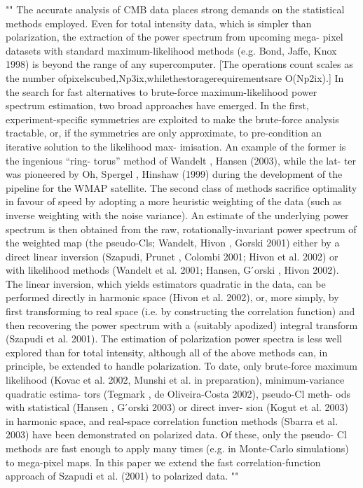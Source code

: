 \documentclass[a4paper, 11pt]{article}
\begin{document}
""
The accurate analysis of CMB data places strong demands on the statistical methods employed. Even for total intensity data, which is simpler than polarization, the extraction of the power spectrum from upcoming mega- pixel datasets with standard maximum-likelihood methods (e.g. Bond, Jaffe, Knox 1998) is beyond the range of any supercomputer. [The operations count scales as the number ofpixelscubed,Np3ix,whilethestoragerequirementsare O(Np2ix).] In the search for fast alternatives to brute-force maximum-likelihood power spectrum estimation, two broad approaches have emerged. In the first, experiment-specific symmetries are exploited to make the brute-force analysis tractable, or, if the symmetries are only approximate, to pre-condition an iterative solution to the likelihood max- imisation. An example of the former is the ingenious “ring- torus” method of Wandelt , Hansen (2003), while the lat- ter was pioneered by Oh, Spergel , Hinshaw (1999) during the development of the pipeline for the WMAP satellite. The second class of methods sacrifice optimality in favour of speed by adopting a more heuristic weighting of the data (such as inverse weighting with the noise variance). An estimate of the underlying power spectrum is then obtained from the raw, rotationally-invariant power spectrum of the weighted map (the pseudo-Cls; Wandelt, Hivon , Gorski 2001) either by a direct linear inversion (Szapudi, Prunet , Colombi 2001; Hivon et al. 2002) or with likelihood methods (Wandelt et al. 2001; Hansen, G ́orski , Hivon 2002). The linear inversion, which yields estimators quadratic in the data, can be performed directly in harmonic space (Hivon et al. 2002), or, more simply, by first transforming to real space (i.e. by constructing the correlation function) and then recovering the power spectrum with a (suitably apodized) integral transform (Szapudi et al. 2001). The estimation of polarization power spectra is less well explored than for total intensity, although all of the above methods can, in principle, be extended to handle polarization. To date, only brute-force maximum likelihood (Kovac et al. 2002, Munshi et al. in preparation), minimum-variance quadratic estima- tors (Tegmark , de Oliveira-Costa 2002), pseudo-Cl meth- ods with statistical (Hansen , G ́orski 2003) or direct inver- sion (Kogut et al. 2003) in harmonic space, and real-space correlation function methods (Sbarra et al. 2003) have been demonstrated on polarized data. Of these, only the pseudo- Cl methods are fast enough to apply many times (e.g. in Monte-Carlo simulations) to mega-pixel maps. In this paper we extend the fast correlation-function approach of Szapudi et al. (2001) to polarized data.
""
\end{document}
